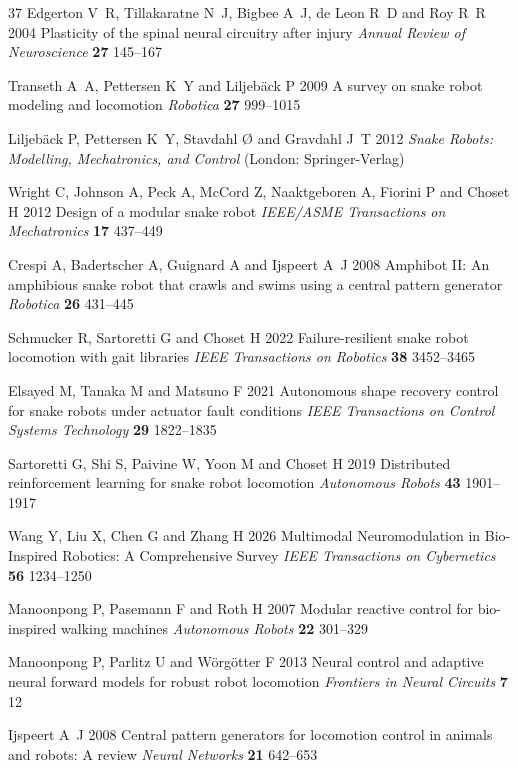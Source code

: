 \documentclass{iopjournal}
\begin{document}
\begin{thebibliography}{37}
Edgerton V~R, Tillakaratne N~J, Bigbee A~J, de Leon R~D and Roy R~R 2004 Plasticity of the spinal neural circuitry after injury {\em Annual Review of Neuroscience\/} {\bf 27} 145--167

Transeth A~A, Pettersen K~Y and Liljeb{\"a}ck P 2009 A survey on snake robot modeling and locomotion {\em Robotica\/} {\bf 27} 999--1015

Liljeb{\"a}ck P, Pettersen K~Y, Stavdahl {\O} and Gravdahl J~T 2012 {\em Snake Robots: Modelling, Mechatronics, and Control\/} (London: Springer-Verlag)

Wright C, Johnson A, Peck A, McCord Z, Naaktgeboren A, Fiorini P and Choset H 2012 Design of a modular snake robot {\em IEEE/ASME Transactions on Mechatronics\/} {\bf 17} 437--449

Crespi A, Badertscher A, Guignard A and Ijspeert A~J 2008 Amphibot II: An amphibious snake robot that crawls and swims using a central pattern generator {\em Robotica\/} {\bf 26} 431--445

Schmucker R, Sartoretti G and Choset H 2022 Failure-resilient snake robot locomotion with gait libraries {\em IEEE Transactions on Robotics\/} {\bf 38} 3452--3465

Elsayed M, Tanaka M and Matsuno F 2021 Autonomous shape recovery control for snake robots under actuator fault conditions {\em IEEE Transactions on Control Systems Technology\/} {\bf 29} 1822--1835

Sartoretti G, Shi S, Paivine W, Yoon M and Choset H 2019 Distributed reinforcement learning for snake robot locomotion {\em Autonomous Robots\/} {\bf 43} 1901--1917

Wang Y, Liu X, Chen G and Zhang H 2026 Multimodal Neuromodulation in Bio-Inspired Robotics: A Comprehensive Survey {\em IEEE Transactions on Cybernetics\/} {\bf 56} 1234--1250

Manoonpong P, Pasemann F and Roth H 2007 Modular reactive control for bio-inspired walking machines {\em Autonomous Robots\/} {\bf 22} 301--329

Manoonpong P, Parlitz U and W{\"o}rg{\"o}tter F 2013 Neural control and adaptive neural forward models for robust robot locomotion {\em Frontiers in Neural Circuits\/} {\bf 7} 12

Ijspeert A~J 2008 Central pattern generators for locomotion control in animals and robots: A review {\em Neural Networks\/} {\bf 21} 642--653


\end{thebibliography}
\end{document}
